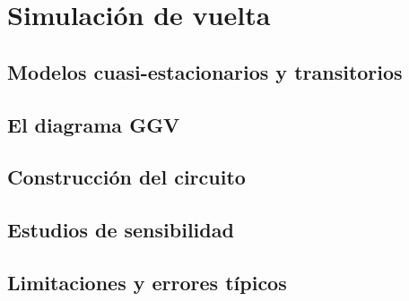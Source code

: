 \chapter{Simulación de vuelta}
\label{ch:simulacion_vuelta}

\begin{objetivos}
  \item {}
  \item {}
  \item {}
\end{objetivos}


\section{Modelos cuasi-estacionarios y transitorios}
\label{sec:simulacion_vuelta:01}

\section{El diagrama GGV}
\label{sec:simulacion_vuelta:02}

\section{Construcción del circuito}
\label{sec:simulacion_vuelta:03}

\section{Estudios de sensibilidad}
\label{sec:simulacion_vuelta:04}

\section{Limitaciones y errores típicos}
\label{sec:simulacion_vuelta:05}


